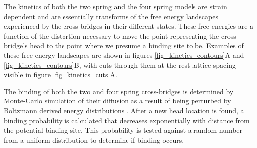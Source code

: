 \documentclass[]{article}
\begin{document}
The kinetics of both the two spring and the four spring models are strain dependent and are essentially transforms of the free energy landscapes experienced by the cross-bridges in their different states.
These free energies are a function of the distortion necessary to move the point representing the cross-bridge's head to the point where we presume a binding site to be.
Examples of these free energy landscapes are shown in figures \ref{fig_kinetics_contours}A and \ref{fig_kinetics_contours}B, with cuts through them at the rest lattice spacing visible in figure \ref{fig_kinetics_cuts}A.

The binding of both the two and four spring cross-bridges is determined by Monte-Carlo simulation of their diffusion as a result of being perturbed by Boltzmann derived energy distributions \citep{DillBook}. 
After a new head location is found, a binding probability is calculated that decreases exponentially with distance from the potential binding site. 
This probability is tested against a random number from a uniform distribution to determine if binding occurs.
\end{document}

